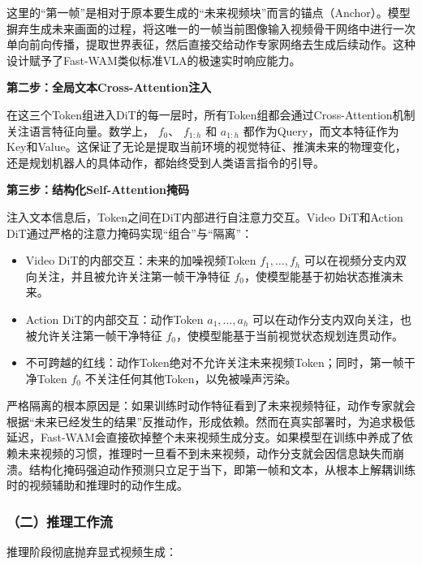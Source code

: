 这里的``第一帧''是相对于原本要生成的``未来视频块''而言的锚点（Anchor）。模型摒弃生成未来画面的过程，将这唯一的一帧当前图像输入视频骨干网络中进行一次单向前向传播，提取世界表征，然后直接交给动作专家网络去生成后续动作。这种设计赋予了Fast-WAM类似标准VLA的极速实时响应能力。

\textbf{第二步：全局文本Cross-Attention注入}

在这三个Token组进入DiT的每一层时，所有Token组都会通过Cross-Attention机制关注语言特征向量。数学上， \(f_0\)、 \(f_{1:h}\) 和 \(a_{1:h}\) 都作为Query，而文本特征作为Key和Value。这保证了无论是提取当前环境的视觉特征、推演未来的物理变化，还是规划机器人的具体动作，都始终受到人类语言指令的引导。

\textbf{第三步：结构化Self-Attention掩码}

注入文本信息后，Token之间在DiT内部进行自注意力交互。Video DiT和Action DiT通过严格的注意力掩码实现``组合''与``隔离''：

\begin{itemize}
\tightlist
\item
  Video DiT的内部交互：未来的加噪视频Token \(f_1,\ldots,f_h\) 可以在视频分支内双向关注，并且被允许关注第一帧干净特征 \(f_0\)，使模型能基于初始状态推演未来。
\item
  Action DiT的内部交互：动作Token \(a_1,\ldots,a_h\) 可以在动作分支内双向关注，也被允许关注第一帧干净特征 \(f_0\)，使模型能基于当前视觉状态规划连贯动作。
\item
  不可跨越的红线：动作Token绝对不允许关注未来视频Token；同时，第一帧干净Token \(f_0\) 不关注任何其他Token，以免被噪声污染。
\end{itemize}

严格隔离的根本原因是：如果训练时动作特征看到了未来视频特征，动作专家就会根据``未来已经发生的结果''反推动作，形成依赖。然而在真实部署时，为追求极低延迟，Fast-WAM会直接砍掉整个未来视频生成分支。如果模型在训练中养成了依赖未来视频的习惯，推理时一旦看不到未来视频，动作分支就会因信息缺失而崩溃。结构化掩码强迫动作预测只立足于当下，即第一帧和文本，从根本上解耦训练时的视频辅助和推理时的动作生成。

\hypertarget{ux4e8cux63a8ux7406ux5de5ux4f5cux6d41}{%
\subsubsection{（二）推理工作流}\label{ux4e8cux63a8ux7406ux5de5ux4f5cux6d41}}

推理阶段彻底抛弃显式视频生成：

